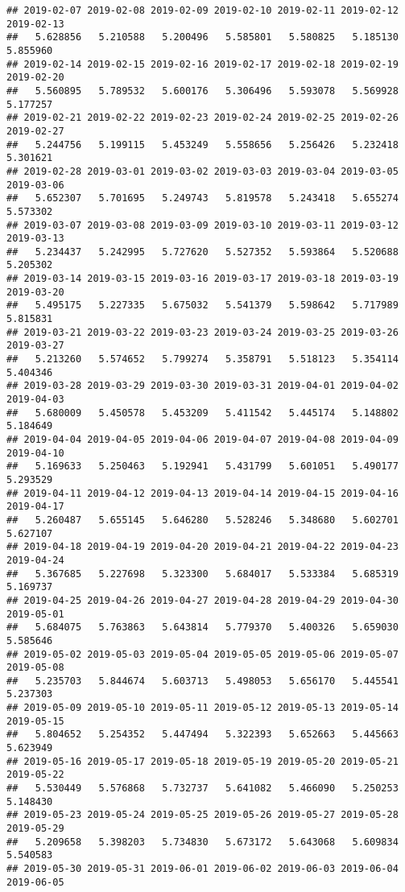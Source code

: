 \documentclass[
]{article}
\begin{document}
\begin{verbatim}
## 2019-02-07 2019-02-08 2019-02-09 2019-02-10 2019-02-11 2019-02-12 2019-02-13 
##   5.628856   5.210588   5.200496   5.585801   5.580825   5.185130   5.855960 
## 2019-02-14 2019-02-15 2019-02-16 2019-02-17 2019-02-18 2019-02-19 2019-02-20 
##   5.560895   5.789532   5.600176   5.306496   5.593078   5.569928   5.177257 
## 2019-02-21 2019-02-22 2019-02-23 2019-02-24 2019-02-25 2019-02-26 2019-02-27 
##   5.244756   5.199115   5.453249   5.558656   5.256426   5.232418   5.301621 
## 2019-02-28 2019-03-01 2019-03-02 2019-03-03 2019-03-04 2019-03-05 2019-03-06 
##   5.652307   5.701695   5.249743   5.819578   5.243418   5.655274   5.573302 
## 2019-03-07 2019-03-08 2019-03-09 2019-03-10 2019-03-11 2019-03-12 2019-03-13 
##   5.234437   5.242995   5.727620   5.527352   5.593864   5.520688   5.205302 
## 2019-03-14 2019-03-15 2019-03-16 2019-03-17 2019-03-18 2019-03-19 2019-03-20 
##   5.495175   5.227335   5.675032   5.541379   5.598642   5.717989   5.815831 
## 2019-03-21 2019-03-22 2019-03-23 2019-03-24 2019-03-25 2019-03-26 2019-03-27 
##   5.213260   5.574652   5.799274   5.358791   5.518123   5.354114   5.404346 
## 2019-03-28 2019-03-29 2019-03-30 2019-03-31 2019-04-01 2019-04-02 2019-04-03 
##   5.680009   5.450578   5.453209   5.411542   5.445174   5.148802   5.184649 
## 2019-04-04 2019-04-05 2019-04-06 2019-04-07 2019-04-08 2019-04-09 2019-04-10 
##   5.169633   5.250463   5.192941   5.431799   5.601051   5.490177   5.293529 
## 2019-04-11 2019-04-12 2019-04-13 2019-04-14 2019-04-15 2019-04-16 2019-04-17 
##   5.260487   5.655145   5.646280   5.528246   5.348680   5.602701   5.627107 
## 2019-04-18 2019-04-19 2019-04-20 2019-04-21 2019-04-22 2019-04-23 2019-04-24 
##   5.367685   5.227698   5.323300   5.684017   5.533384   5.685319   5.169737 
## 2019-04-25 2019-04-26 2019-04-27 2019-04-28 2019-04-29 2019-04-30 2019-05-01 
##   5.684075   5.763863   5.643814   5.779370   5.400326   5.659030   5.585646 
## 2019-05-02 2019-05-03 2019-05-04 2019-05-05 2019-05-06 2019-05-07 2019-05-08 
##   5.235703   5.844674   5.603713   5.498053   5.656170   5.445541   5.237303 
## 2019-05-09 2019-05-10 2019-05-11 2019-05-12 2019-05-13 2019-05-14 2019-05-15 
##   5.804652   5.254352   5.447494   5.322393   5.652663   5.445663   5.623949 
## 2019-05-16 2019-05-17 2019-05-18 2019-05-19 2019-05-20 2019-05-21 2019-05-22 
##   5.530449   5.576868   5.732737   5.641082   5.466090   5.250253   5.148430 
## 2019-05-23 2019-05-24 2019-05-25 2019-05-26 2019-05-27 2019-05-28 2019-05-29 
##   5.209658   5.398203   5.734830   5.673172   5.643068   5.609834   5.540583 
## 2019-05-30 2019-05-31 2019-06-01 2019-06-02 2019-06-03 2019-06-04 2019-06-05 

\end{verbatim}
\end{document}
